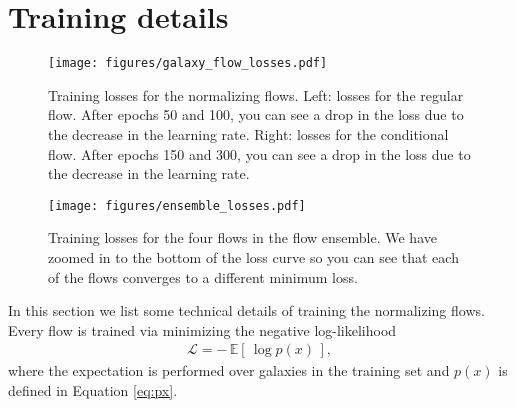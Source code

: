 \documentclass[twocolumn,twocolappendix]{aastex631}
\begin{document}

\appendix

\section{Training details}
\label{app:training-details}

\begin{figure*}[t!]
    \begin{centering}
        \texttt{[image: figures/galaxy\_flow\_losses.pdf]}
        \caption{
            Training losses for the normalizing flows.
            Left: losses for the regular flow.
            After epochs 50 and 100, you can see a drop in the loss due to the decrease in the learning rate.
            Right: losses for the conditional flow.
            After epochs 150 and 300, you can see a drop in the loss due to the decrease in the learning rate.
        }
        \label{fig:galaxy-flow-losses}
    \end{centering}
\end{figure*}

\begin{figure}[t!]
    \begin{centering}
        \texttt{[image: figures/ensemble\_losses.pdf]}
        \caption{
            Training losses for the four flows in the flow ensemble.
            We have zoomed in to the bottom of the loss curve so you can see that each of the flows converges to a different minimum loss.
        }
        \label{fig:ensemble-losses}
    \end{centering}
\end{figure}

In this section we list some technical details of training the normalizing flows.
Every flow is trained via minimizing the negative log-likelihood
\begin{align}
    \mathcal{L} = - \, \mathbb{E}[ \, \log p(x) \, ],
\end{align}
where the expectation is performed over galaxies in the training set and $p(x)$ is defined in Equation \ref{eq:px}.
\end{document}
